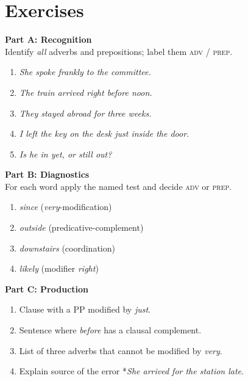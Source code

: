 \clearpage            %
\section*{Exercises}  %

\begin{tcolorbox}[title={Adverbs \& Prepositions},colback=white]
\textbf{Part A: Recognition}\\
\small Identify \emph{all} adverbs and prepositions; label them \textsc{adv} / \textsc{prep}.
\begin{enumerate}[nosep]
  \item \textit{She spoke frankly to the committee.}
  \item \textit{The train arrived right before noon.}
  \item \textit{They stayed abroad for three weeks.}
  \item \textit{I left the key on the desk just inside the door.}
  \item \textit{Is he in yet, or still out?}
\end{enumerate}

\vspace{0.5em}
\textbf{Part B: Diagnostics}\\
\small For each word apply the named test and decide \textsc{adv} or \textsc{prep}.
\begin{enumerate}[nosep]
  \item \textit{since} (\textit{very}-modification)
  \item \textit{outside} (predicative-complement)
  \item \textit{downstairs} (coordination)
  \item \textit{likely} (modifier \textit{right})
\end{enumerate}

\vspace{0.5em}
\textbf{Part C: Production}\\
\small
\begin{enumerate}[nosep]
  \item Clause with a PP modified by \textit{just}.
  \item Sentence where \textit{before} has a clausal complement.
  \item List of three adverbs that cannot be modified by \textit{very}.
  \item Explain source of the error *\textit{She arrived for the station late}.
\end{enumerate}
\end{tcolorbox}

